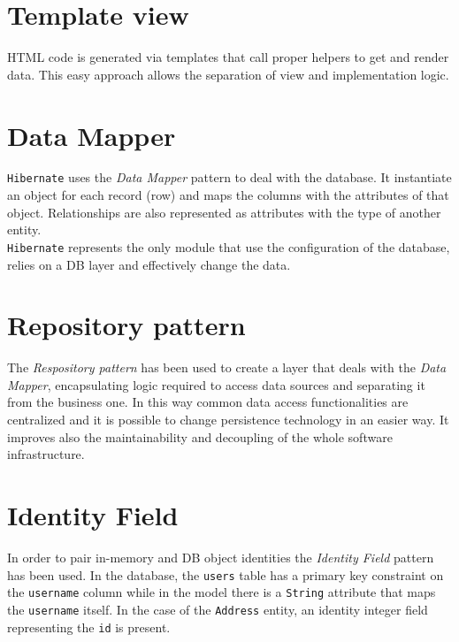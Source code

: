 \documentclass[a4paper]{report}
\begin{document}
	\section{Template view}
	\label{sec:template_view}
	
	HTML code is generated via templates that call proper helpers to get and render data. This easy approach allows the separation of view and implementation logic.
	
	\section{Data Mapper}
	\label{sec:data_mapper}
	
	\texttt{Hibernate} uses the \textit{Data Mapper} pattern to deal with the database. It instantiate an object for each record (row) and maps the columns with the attributes of that object. Relationships are also represented as attributes with the type of another entity.\\
	\texttt{Hibernate} represents the only module that use the configuration of the database, relies on a DB layer and effectively change the data.
	
	\section{Repository pattern}
	\label{sec:repository_pattern}
	
	The \textit{Respository pattern} has been used to create a layer that deals with the \textit{Data Mapper}, encapsulating logic required to access data sources and separating it from the business one. In this way common data access functionalities are centralized and it is possible to change persistence technology in an easier way. It improves also the maintainability and decoupling of the whole software infrastructure.
	
	\section{Identity Field}
	\label{sec:identity_field}
	
	In order to pair in-memory and DB object identities the \textit{Identity Field} pattern has been used. In the database, the \texttt{users} table has a primary key constraint on the \texttt{username} column while in the model there is a \texttt{String} attribute that maps the \texttt{username} itself. In the case of the \texttt{Address} entity, an identity integer field representing the \texttt{id} is present.
	
\end{document}
